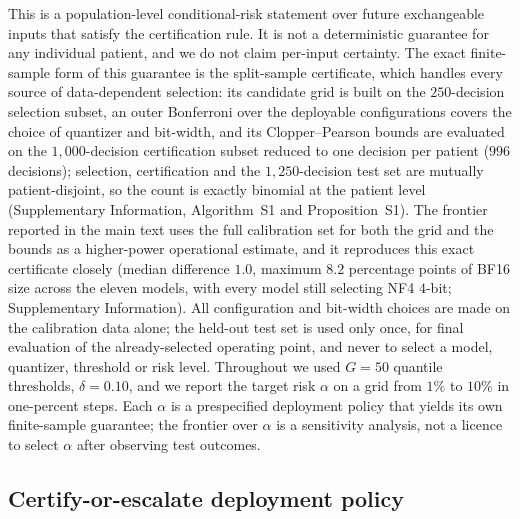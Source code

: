 \documentclass[pdflatex,sn-mathphys-num]{sn-jnl}%
\theoremstyle{thmstyleone}%
\theoremstyle{thmstyletwo}%
\theoremstyle{thmstylethree}%
\begin{document}
This is a population-level conditional-risk statement over future exchangeable inputs that satisfy
the certification rule. It is not a deterministic guarantee for any individual patient, and we do
not claim per-input certainty. The exact finite-sample form of this guarantee is the split-sample
certificate, which handles every source of data-dependent selection: its candidate grid is built on the
$250$-decision selection subset, an outer Bonferroni
over the deployable configurations covers the choice of
quantizer and bit-width, and its Clopper--Pearson bounds are evaluated on the $1{,}000$-decision certification
subset reduced to one decision per patient ($996$ decisions); selection, certification and the $1{,}250$-decision
test set are mutually patient-disjoint, so the count is exactly binomial at the patient level (Supplementary Information,
Algorithm~S1 and Proposition~S1). The frontier reported in the main text uses the full calibration set
for both the grid and the bounds as a higher-power operational estimate, and it reproduces this exact
certificate closely (median difference $1.0$, maximum $8.2$ percentage points of BF16 size across the
eleven models, with every model still selecting NF4 $4$-bit; Supplementary Information). All
configuration and bit-width choices are made on the calibration data alone; the held-out test set is
used only once, for final evaluation of the already-selected operating point, and never to select a
model, quantizer, threshold or risk level. Throughout we used $G=50$ quantile thresholds,
$\delta=0.10$, and we report the target risk $\alpha$ on a grid from $1\%$ to $10\%$ in one-percent
steps. Each $\alpha$ is a prespecified deployment policy that yields its own finite-sample guarantee;
the frontier over $\alpha$ is a sensitivity analysis, not a licence to select $\alpha$ after observing
test outcomes.
 
\subsection*{Certify-or-escalate deployment policy}
 
\end{document}
